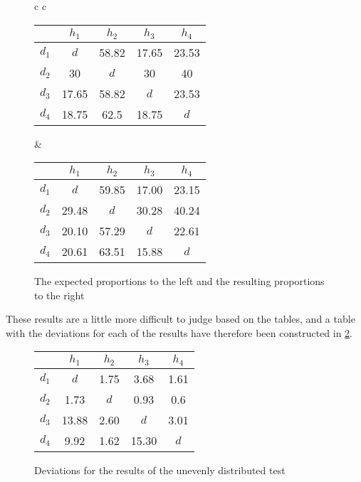 \begin{figure}

\begin{tabular} {c c }

\begin{tabular}{ | c | c c c c |}
	\hline
	 & $ h_1 $ & $ h_2 $ & $ h_3 $ & $ h_4 $\\
	\hline
	$ d_1 $ & $ d $ & 58.82 & 17.65 & 23.53\\
	$ d_2 $ & 30 & $ d $ & 30 & 40\\
	$ d_3 $ & 17.65 & 58.82 & $ d $ & 23.53\\
	$ d_4 $ & 18.75 & 62.5 & 18.75 & $ d $\\
	\hline
\end{tabular}

&

\begin{tabular}{ | c | c c c c |}
	\hline
	& $ h_1 $ & $ h_2 $ & $ h_3 $ & $ h_4 $\\
	\hline
	$ d_1 $ & $ d $ & 59.85 & 17.00 & 23.15\\
	$ d_2 $ & 29.48 & $ d $ & 30.28 & 40.24\\
	$ d_3 $ & 20.10 & 57.29 & $ d $ & 22.61 \\
	$ d_4 $ & 20.61 & 63.51 & 15.88 & $ d $\\
	\hline
\end{tabular}
\end{tabular}
\caption{The expected proportions to the left and the resulting proportions to the right}\label{uneven_results}
\end{figure}

These results are a little more difficult to judge based on the tables, and a table with the deviations for each of the results have therefore been constructed in \cref{deviations}.

\begin{figure}
	\centering
	\begin{tabular}{ | c | c c c c |}
	\hline
	& $ h_1 $ & $ h_2 $ & $ h_3 $ & $ h_4 $\\
	\hline
	$ d_1 $ & $ d $ & 1.75 & 3.68 & 1.61\\
	$ d_2 $ & 1.73 & $ d $ & 0.93 & 0.6\\
	$ d_3 $ & 13.88 & 2.60 & $ d $ & 3.01 \\
	$ d_4 $ & 9.92 & 1.62 & 15.30 & $ d $\\
	\hline
\end{tabular}
\caption{Deviations for the results of the unevenly distributed test} \label{deviations}
\end{figure}

